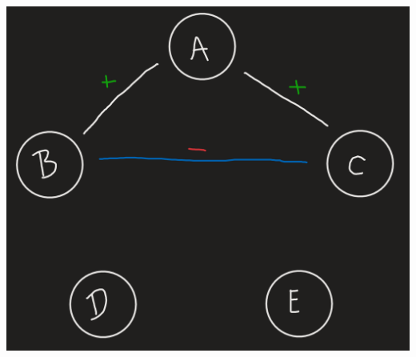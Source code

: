 \documentclass[11pt]{article}
\begin{document}
\begin{enumerate}
{\begin{center}
	\includegraphics[scale=0.5]{Figure_3_2_4}\\
\end{center}
}


\end{enumerate}
\end{document}

